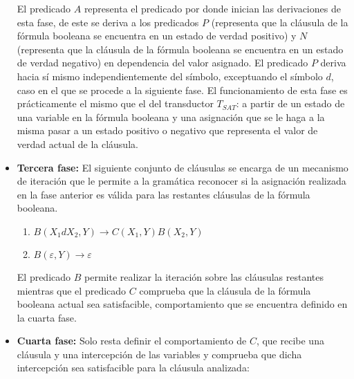 \begin{itemize}
          El predicado $A$ representa el predicado por donde inician las derivaciones de esta fase, de este se
          deriva a los predicados $P$ (representa que la cláusula de la fórmula booleana se encuentra en un
          estado de verdad positivo) y $N$ (representa que la cláusula de la fórmula booleana se encuentra en
          un estado de verdad negativo) en dependencia del valor asignado. El predicado $P$ deriva hacia sí
          mismo independientemente del símbolo, exceptuando el símbolo $d$, caso en el que se procede a la
          siguiente fase.  El funcionamiento de esta fase es prácticamente el mismo que el del transductor
          $T_{SAT}$: a partir de un estado de una variable en la fórmula booleana y una asignación que se le
          haga a la misma pasar a un estado positivo o negativo que representa el valor de verdad actual de la
          cláusula.

    \item \textbf{Tercera fase:} El siguiente conjunto de cláusulas se encarga de un mecanismo de iteración que
          le permite a la gramática reconocer si la asignación realizada en la fase anterior es válida para las restantes
          cláusulas de la fórmula booleana.
          \begin{enumerate}[start=21]
              \item $B(X_1dX_2,Y)\to C(X_1,Y) B(X_2,Y)$
              \item $B(\varepsilon,Y)\to\varepsilon$
          \end{enumerate}

          El predicado $B$ permite realizar la iteración sobre las cláusulas restantes mientras que el
          predicado $C$ comprueba que la cláusula de la fórmula booleana actual sea satisfacible, comportamiento
          que se encuentra definido en la cuarta fase.

    \item \textbf{Cuarta fase:} Solo resta definir el comportamiento de $C$, que recibe una cláusula y una intercepción
          de las variables y comprueba que dicha intercepción sea satisfacible para la cláusula analizada:
          \begin{enumerate}[start=23]
\end{enumerate}
\end{itemize}
